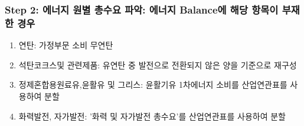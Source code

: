 \documentclass[10pt,compress,slidetop,%
			   hyperref={unicode},xcolor={svgnames},%
			   t]{beamer}
\begin{document}
%
\begin{frame}
	\frametitle{Step 2: 에너지 원별 총수요 파악: 에너지 Balance에 해당 항목이 부재한 경우}	
	\begin{enumerate}
	\item{연탄: 가정부문 소비 무연탄 }
	\item{석탄코크스및 관련제품: 유연탄 중 발전으로 전환되지 않은 양을 기준으로 재구성 }
	\item{정제혼합용원료유,윤활유 및 그리스: 윤활기유 1차에너지 소비를 산업연관표를 사용하여 분할}
	\item{화력발전, 자가발전: '화력 및 자가발전 총수요'를 산업연관표를 사용하여 분할}
	\end{enumerate}
\end{frame}
%
\end{document}
